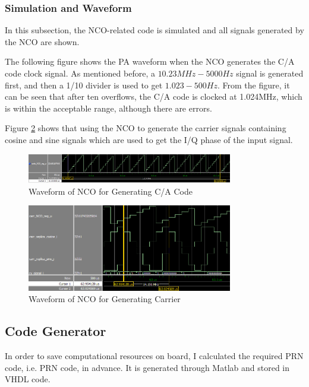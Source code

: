 \subsubsection{Simulation and Waveform}
In this subsection, the NCO-related code is simulated and all signals generated by the NCO are shown.

The following figure shows the PA waveform when the NCO generates the C/A code clock signal. As mentioned before, a $10.23MHz-\num{5000}Hz$ signal is generated first, and then a 1/10 divider is used to get $1.023-500Hz$. From the figure, it can be seen that after ten overflows, the C/A code is clocked at 1.024MHz, which is within the acceptable range, although there are errors.

Figure \ref{fig:nco_carrier_wave} shows that using the NCO to generate the carrier signals containing cosine and sine signals which are used to get the I/Q phase of the input signal.

\begin{figure}[!htbp]
    \centering
    \includegraphics[width=0.8\textwidth]{_IMAGES/nco_code_wave.png}
    \caption{Waveform of NCO for Generating C/A Code}
    \label{fig:nco_code_wave}
\end{figure}

\begin{figure}[!htbp]
    \centering
    \includegraphics[width=0.8\textwidth]{_IMAGES/nco_carrier_wave.png}
    \caption{Waveform of NCO for Generating Carrier}
    \label{fig:nco_carrier_wave}
\end{figure}

\subsection{Code Generator}
In order to save computational resources on board, I calculated the required PRN code, i.e. PRN  code, in advance. It is generated through Matlab and stored in VHDL code.

